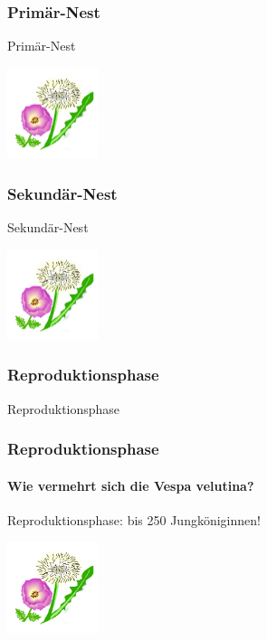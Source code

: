 \documentclass[aspectratio=169]{beamer}
\begin{document}
\subsubsection[Sekundär-Nest]{Primär-Nest}


		\begin{frame}{Primär-Nest}
			\begin{center}	
				\includegraphics[width=0.2\textwidth]{figures/BH-Logo_Quat.png}
			\end{center}
	
			\end{frame}

\subsubsection[Sekundär-Nest]{Sekundär-Nest}


			\begin{frame}{Sekundär-Nest}
				\begin{center}	
					\includegraphics[width=0.2\textwidth]{figures/BH-Logo_Quat.png}
				\end{center}
		
				\end{frame}


\subsubsection[Reproduktionsphase]{Reproduktionsphase}

\begin{frame}{Reproduktionsphase}
\frametitle{Reproduktionsphase} 
\framesubtitle{Wie vermehrt sich die Vespa velutina?}

\begin{examples}{Reproduktionsphase:  }{bis 250 Jungköniginnen!}
\begin{center}	
    \includegraphics[width=0.2\textwidth]{figures/BH-Logo_Quat.png}
\end{center}
\end{examples}
\end{frame}
\end{document}
